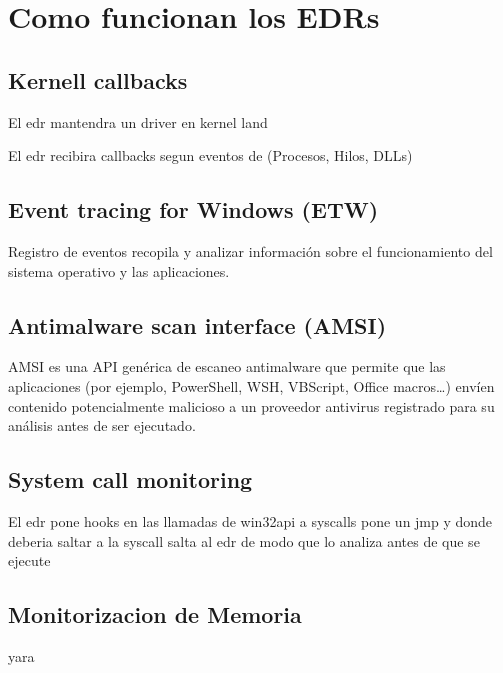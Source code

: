 \chapter{Como funcionan los EDRs}

\section{Kernell callbacks}

El edr mantendra un driver en kernel land

El edr recibira callbacks segun eventos de (Procesos, Hilos, DLLs)

\section{Event tracing for Windows (ETW)}

Registro de eventos recopila y analizar información sobre el funcionamiento 
del sistema operativo y las aplicaciones.

\section{Antimalware scan interface (AMSI)}

AMSI es una API genérica de escaneo antimalware que permite que las aplicaciones
(por ejemplo, PowerShell, WSH, VBScript, Office macros…) envíen contenido 
potencialmente malicioso a un proveedor antivirus registrado para su análisis 
antes de ser ejecutado.

\section{System call monitoring}

El edr pone hooks en las llamadas de win32api a syscalls
pone un jmp y donde deberia saltar a la syscall salta al edr de modo que lo 
analiza antes de que se ejecute

\section{Monitorizacion de Memoria}

yara